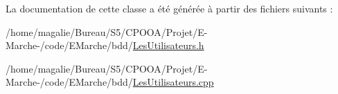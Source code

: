 La documentation de cette classe a été générée à partir des fichiers suivants \-:\begin{DoxyCompactItemize}
\item 
/home/magalie/\-Bureau/\-S5/\-C\-P\-O\-O\-A/\-Projet/\-E-\/\-Marche-\//code/\-E\-Marche/bdd/\hyperlink{_les_utilisateurs_8h}{Les\-Utilisateurs.\-h}\item 
/home/magalie/\-Bureau/\-S5/\-C\-P\-O\-O\-A/\-Projet/\-E-\/\-Marche-\//code/\-E\-Marche/bdd/\hyperlink{_les_utilisateurs_8cpp}{Les\-Utilisateurs.\-cpp}\end{DoxyCompactItemize}
